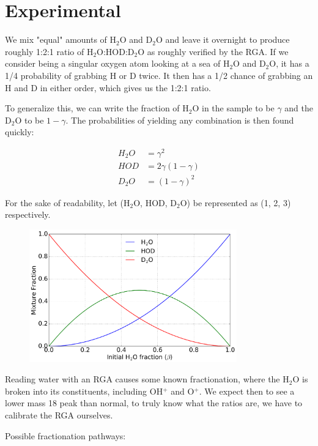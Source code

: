 \section{Experimental}

We mix "equal" amounts of H$_2$O and D$_2$O and leave it overnight to produce roughly 1:2:1 ratio of H$_2$O:HOD:D$_2$O as roughly verified by the RGA. If we consider being a singular oxygen atom looking at a sea of H$_2$O and D$_2$O, it has a 1/4 probability of grabbing H or D twice. It then has a 1/2 chance of grabbing an H and D in either order, which gives us the 1:2:1 ratio.

To generalize this, we can write the fraction of H$_2$O in the sample to be $\gamma$ and the D$_2$O to be $1-\gamma$. The probabilities of yielding any combination is then found quickly:

\begin{align}
H_2O& = \gamma^2 \\
HOD& = 2\gamma(1-\gamma) \\
D_2O& = (1-\gamma)^2
\end{align}

For the sake of readability, let (H$_2$O, HOD, D$_2$O) be represented as (1, 2, 3) respectively.

\begin{figure}[H]
\label{fig: mixture}
\centering
\includegraphics[width=0.8\textwidth]{images/behod_isotopologues.png}
\caption{}
\end{figure}

Reading water with an RGA causes some known fractionation, where the H$_2$O is broken into its constituents, including OH$^+$ and O$^+$. We expect then to see a lower mass 18 peak than normal, to truly know what the ratios are, we have to calibrate the RGA ourselves.

Possible fractionation pathways:

